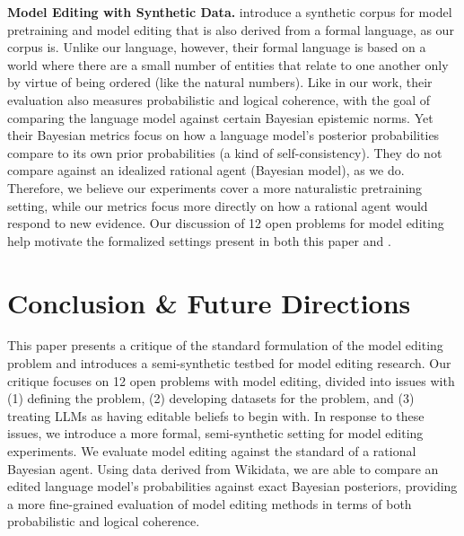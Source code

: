 \documentclass[11pt,a4paper]{article}
\begin{document}
\vspace{6pt}
\noindent\textbf{Model Editing with Synthetic Data.} \citet{betz2023probabilistic} introduce a synthetic corpus for model pretraining and model editing that is also derived from a formal language, as our corpus is. Unlike our language, however, their formal language is based on a world where there are a small number of entities that relate to one another only by virtue of being ordered (like the natural numbers). Like in our work, their evaluation also measures probabilistic and logical coherence, with the goal of comparing the language model against certain Bayesian epistemic norms. Yet their Bayesian metrics focus on how a language model's posterior probabilities compare to its own prior probabilities (a kind of self-consistency). They do not compare against an idealized rational agent (Bayesian model), as we do. Therefore, we believe our experiments cover a more naturalistic pretraining setting, while our metrics focus more directly on how a rational agent would respond to new evidence. 
Our discussion of 12 open problems for model editing help motivate the formalized settings present in both this paper and \citet{betz2023probabilistic}.

\section{Conclusion \& Future Directions}
\label{sec:conclusion}

This paper presents a critique of the standard formulation of the model editing problem and introduces a semi-synthetic testbed for model editing research. Our critique focuses on 12 open problems with model editing, divided into issues with (1) defining the problem, (2) developing datasets for the problem, and (3) treating LLMs as having editable beliefs to begin with. In response to these issues, we introduce a more formal, semi-synthetic setting for model editing experiments. We evaluate model editing against the standard of a rational Bayesian agent. Using data derived from Wikidata, we are able to compare an edited language model's probabilities against exact Bayesian posteriors, providing a more fine-grained evaluation of model editing methods in terms of both probabilistic and logical coherence. 
\end{document}

